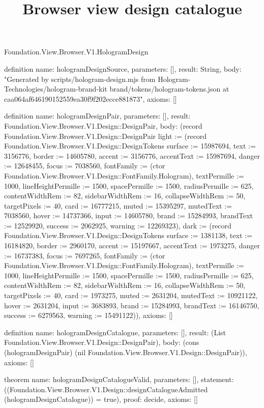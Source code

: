 \begin{lexlean}{Foundation.View.Browser.V1.HologramDesign}
\title{Browser view design catalogue}
\begin{semanticmodule}
definition{
  name: hologramDesignSource,
  parameters: [],
  result: String,
  body: "Generated by scripts/hologram-design.mjs from Hologram-Technologies/hologram-brand-kit brand/tokens/hologram-tokens.json at caa064af646190152559ea30f9f202ecce881873",
  axioms: []
}

definition{
  name: hologramDesignPair,
  parameters: [],
  result: Foundation.View.Browser.V1.Design::DesignPair,
  body: (record Foundation.View.Browser.V1.Design::DesignPair {light := (record Foundation.View.Browser.V1.Design::DesignTokens {surface := 15987694, text := 3156776, border := 14605780, accent := 3156776, accentText := 15987694, danger := 12648455, focus := 7038560, fontFamily := (ctor Foundation.View.Browser.V1.Design::FontFamily.Hologram), textPermille := 1000, lineHeightPermille := 1500, spacePermille := 1500, radiusPermille := 625, contentWidthRem := 82, sidebarWidthRem := 16, collapseWidthRem := 50, targetPixels := 40, card := 16777215, muted := 15395297, mutedText := 7038560, hover := 14737366, input := 14605780, brand := 15284993, brandText := 12529920, success := 2062925, warning := 12269323}), dark := (record Foundation.View.Browser.V1.Design::DesignTokens {surface := 1381138, text := 16184820, border := 2960170, accent := 15197667, accentText := 1973275, danger := 16737383, focus := 7697265, fontFamily := (ctor Foundation.View.Browser.V1.Design::FontFamily.Hologram), textPermille := 1000, lineHeightPermille := 1500, spacePermille := 1500, radiusPermille := 625, contentWidthRem := 82, sidebarWidthRem := 16, collapseWidthRem := 50, targetPixels := 40, card := 1973275, muted := 2631204, mutedText := 10921122, hover := 2631204, input := 3683893, brand := 15284993, brandText := 16146750, success := 6279563, warning := 15491122})}),
  axioms: []
}

definition{
  name: hologramDesignCatalogue,
  parameters: [],
  result: (List Foundation.View.Browser.V1.Design::DesignPair),
  body: (cons (hologramDesignPair) (nil Foundation.View.Browser.V1.Design::DesignPair)),
  axioms: []
}

theorem{
  name: hologramDesignCatalogueValid,
  parameters: [],
  statement: ((Foundation.View.Browser.V1.Design::designCatalogueAdmitted (hologramDesignCatalogue)) = true),
  proof: decide{},
  axioms: []
}
\end{semanticmodule}
\end{lexlean}
